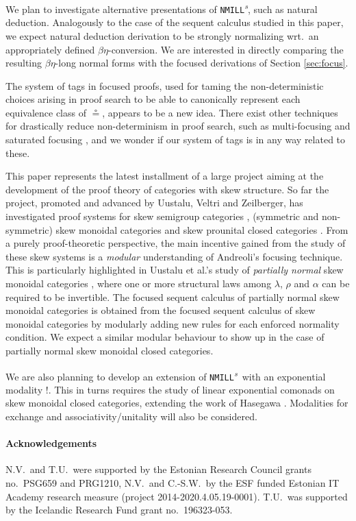 \documentclass[submission,copyright,creativecommons]{eptcs}
\theoremstyle{definition}
\newcommand{\NMILL}{\texttt{NMILL}}
\newcommand{\SkNMILL}{\NMILL\textsuperscript{\textit{s}}}
\begin{document}
We plan to investigate alternative presentations of \SkNMILL, such as natural deduction. Analogously to the case of the sequent calculus studied in this paper, we expect natural deduction derivation to be strongly normalizing wrt.\ an appropriately defined $\beta\eta$-conversion. We are interested in directly comparing the resulting $\beta\eta$-long normal forms with the focused derivations of Section \ref{sec:focus}.

The system of tags in focused proofs, used for taming the non-deterministic choices arising in proof search to be able to canonically represent each equivalence class of $\circeq$, appears to be a new idea. %
There exist other techniques for drastically reduce non-determinism in proof search, such as multi-focusing \cite{chaudhuri:canonical:2008} and saturated focusing \cite{scherer:simple:2015}, and we wonder if our system of tags is in any way related to these. %

This paper represents the latest installment of a large project aiming at the development of the proof theory of categories with skew structure. So far the project, promoted and advanced by Uustalu, Veltri and Zeilberger, has investigated proof systems for skew semigroup categories \cite{zeilberger:semiassociative:19}, (symmetric and non-symmetric) skew monoidal categories \cite{uustalu:sequent:2021,uustalu:proof:nodate,veltri:coherence:2021} and skew prounital closed categories \cite{uustalu:deductive:nodate}. From a purely proof-theoretic perspective, the main incentive gained from the study of these skew systems is a \emph{modular} understanding of Andreoli's focusing technique. This is particularly highlighted in Uustalu et al.'s study of \emph{partially normal} skew monoidal categories \cite{uustalu:proof:nodate}, where one or more structural laws among $\lambda$, $\rho$ and $\alpha$ can be required to be invertible. The focused sequent calculus of partially normal skew monoidal categories is obtained from the focused sequent calculus of skew monoidal categories by modularly adding new rules for each enforced normality condition.
We expect a similar modular behaviour to show up in the case of partially normal skew monoidal closed categories.

We are also planning to develop an extension of \SkNMILL\ with an exponential modality $!$. This in turns requires the study of linear exponential comonads on skew monoidal closed categories, extending the work of Hasegawa \cite{hasegawa:linear:2017}. Modalities for exchange \cite{jiang:lambek:2019} and associativity/unitality will also be considered.

\paragraph{Acknowledgements} N.V.\ and T.U.\ were supported by the
Estonian Research Council grants no.~PSG659 and PRG1210, N.V.\ and
C.-S.W.\ by the ESF funded Estonian IT Academy research measure
(project 2014-2020.4.05.19-0001). T.U.\ was supported by the Icelandic
Research Fund grant no.~196323-053.

  
  
\end{document}
